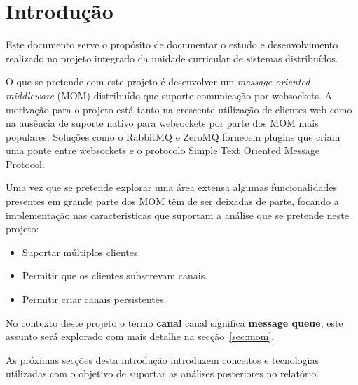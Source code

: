 \section{Introdução}

Este documento serve o propósito de documentar o estudo e desenvolvimento realizado no projeto integrado da unidade curricular de sistemas distribuídos.

O que se pretende com este projeto é desenvolver um \textit{message-oriented middleware} (MOM) distribuído que suporte comunicação por websockets. 
A motivação para o projeto está tanto na crescente utilização de clientes web como na ausência de suporte nativo para websockets por parte dos MOM mais populares. Soluções como o RabbitMQ e ZeroMQ fornecem plugins que criam uma ponte entre websockets e o protocolo Simple Text Oriented Message Protocol.

Uma vez que se pretende explorar uma área extensa algumas funcionalidades presentes em grande parte dos MOM têm de ser deixadas de parte, focando a implementação nas caracteristicas que suportam a análise que se pretende neste projeto:

\begin{itemize}
\item Suportar múltiplos clientes.
\item Permitir que os clientes subscrevam canais.
\item Permitir criar canais persistentes.
\end{itemize}

No contexto deste projeto o termo \textbf{canal} canal significa \textbf{message queue}, este assunto será explorado com mais detalhe na secção~\ref{sec:mom}.


As próximas secções desta introdução introduzem conceitos e tecnologias utilizadas com o objetivo de suportar as análises posteriores no relatório.


